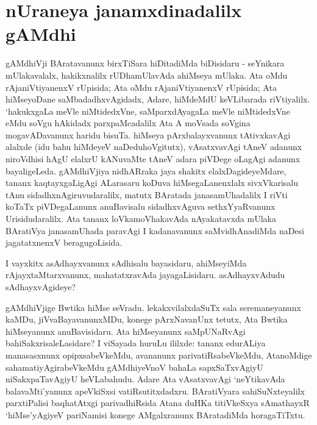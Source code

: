 \makeatletter
\def\@makechapterhead#1{%
  \vspace*{10\p@}%
{\fontsize{13pt}{13pt}\selectfont\raggedright{\bf  kArflx jAsapxrf}\par}
\vspace*{25\p@}%
  {\parindent \z@ \centering \normalfont
    \ifnum \c@secnumdepth >\m@ne
      \if@mainmatter
        {\LARGE\bfseries  #1}\par\nobreak
	\vskip 4pt
      \fi
    \fi
\smallskip 

 \vskip 10\p@  
{\fontsize{12pt}{12pt}\selectfont\raggedleft{anu: \bf pu.ti.na.}\par}
  }
\vskip 40\p@}
\makeatother


\chapter{nUraneya janamxdinadalilx gAMdhi}\label{chap1}


gAMdhiVji BAratavanunx birxTiSara hiDitadiMda biDisidaru - seYnikara mUlakavalalx, hakikxnalilx rUDhamUlavAda ahiMseya mUlaka. Ata oMdu rAjaniVtiyanenxV rUpisida; Ata oMdu rAjaniVtiyanenxV rUpisida; Ata hiMseyoDane saMbadadhxvAgidadx, Adare, hiMdeMdU keVLibarada riVtiyalilx. `hakukxgaLa meVle niMtidedxVne, saMparxdAyagaLa meVle niMtidedxVne eMdu soVgu hAkidadx parxpaMcadalilx Ata A moVsada soVgina mogavADavanunx haridu bisuTa. hiMseya pArxbalayxvanunx tAtivxkavAgi alalxde (idu bahu hiMdeyeV naDeduhoVgitutx), vAsatxvavAgi tAneV adanunx niroVdhisi hAgU elalxrU kANuvaMte tAneV adara piVDege oLagAgi adanunx bayaligeLeda. gAMdhiVjiya nidhARraka jaya shakitx elalxDagideyeMdare, tananx kaqtayxgaLigAgi ALarasaru koDuva hiMsegaLanenxlalx sivxVkarisalu tAnu sidadhxnAgiruvudaralilx, matutx BAratada janasamUhadalilx I riVti koTaTx piVDegaLanunx anuBavisalu sidadhxvAguva sethxYyaRvanunx Urisidudaralilx. Ata tananx loVkamoVhakavAda nAyakatavxda mUlaka BAratiVya janasamUhada paravAgi I kadanavanunx saMvidhAnadiMda naDesi jagatatxnenxV beragugoLisida.

I vayxkitx asAdhayxvanunx sAdhisalu bayasidaru, ahiMseyiMda rAjayxtaMtarxvanunx, mahatatxravAda jayagaLisidaru. asAdhayxvAdudu sAdhayxvAgideye?

gAMdhiVjige Bwtika hiMse seVradu. lekakxvilalxdaSuTx sala seremaneyanunx kaMDu, jiVvaBayavanunxMDu, konege pArxNavanUnx tetutx, Ata Bwtika hiMseyanunx anuBavisidaru. Ata hiMseyanunx saMpUNaRvAgi bahiSakxrisaleLasidare? I viSayada huruLu ililxde: tananx edurALiya manasasxnunx opipxsabeVkeMdu, avananunx parivatiRsabeVkeMdu, AtanoMdige sahamatiyAgirabeVkeMdu gAMdhiyeVnoV bahaLa sapxSaTxvAgiyU niSakxpaTavAgiyU heVLabahudu. Adare Ata vAsatxvavAgi `neYtikavAda balavaMti'yanunx apeVkiSxsi vatiRsutitxdadxru. BAratiVyara sahiSuNxteyalilx parxtiPalisi baqhatAtxgi parivadhiRsida Atana duHKa titiVkeSxya sAmathayxR `hiMse'yAgiyeV pariNamisi konege AMgalxranunx BAratadiMda horagaTiTxtu.


